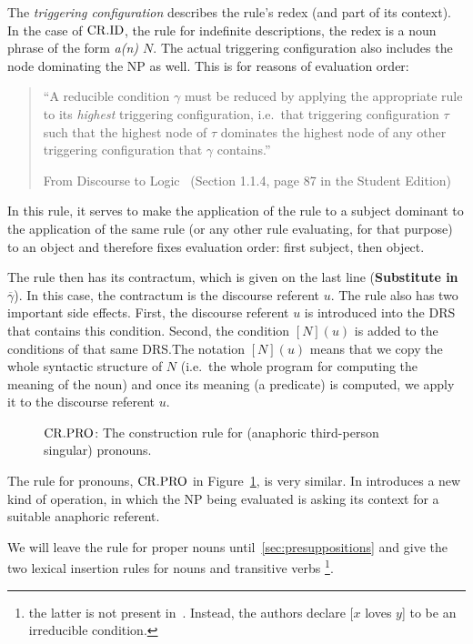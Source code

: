 The \emph{triggering configuration} describes the rule's redex (and part of
its context). In the case of $\mathrm{CR.ID}$, the rule for indefinite descriptions,
the redex is a noun phrase of the form \emph{a(n) $N$}. The actual
triggering configuration also includes the node dominating the NP as
well. This is for reasons of evaluation order:

\begin{quote}
``A reducible condition $\gamma$ must be reduced by applying the appropriate
rule to its \emph{highest} triggering configuration, i.e.\ that triggering
configuration $\tau$ such that the highest node of $\tau$ dominates the
highest node of any other triggering configuration that $\gamma$ contains.''
\begin{flushright}
  From Discourse to Logic~\cite{kamp1993discourse} (Section 1.1.4, page 87
  in the Student Edition)
\end{flushright}
\end{quote}

In this rule, it serves to make the application of the rule to a subject
dominant to the application of the same rule (or any other rule evaluating,
for that purpose) to an object and therefore fixes evaluation order: first
subject, then object.

The rule then has its contractum, which is given on the last line
(\textbf{Substitute in $\overline{\gamma}$}). In this case, the contractum
is the discourse referent $u$. The rule also has two important side
effects. First, the discourse referent $u$ is introduced into the DRS that
contains this condition. Second, the condition $[N](u)$ is added to the
conditions of that same DRS.\@ The notation $[N](u)$ means that we copy the
whole syntactic structure of $N$ (i.e.\ the whole program for computing the
meaning of the noun) and once its meaning (a predicate) is computed, we
apply it to the discourse referent $u$.

\begin{figure}
\centering
\crprobox
\caption{\label{fig:crpro} $\mathrm{CR.PRO}$: The construction rule for (anaphoric
  third-person singular) pronouns.}
\end{figure}

The rule for pronouns, $\mathrm{CR.PRO}$ in Figure~\ref{fig:crpro}, is very
similar. In introduces a new kind of operation, in which the NP being
evaluated is asking its context for a suitable anaphoric referent.

We will leave the rule for proper nouns until~\ref{sec:presuppositions} and
give the two lexical insertion rules for nouns and transitive verbs
\footnote{the latter is not present in~\cite{kamp1993discourse}. Instead,
  the authors declare [$x$ loves $y$] to be an irreducible condition.}.

